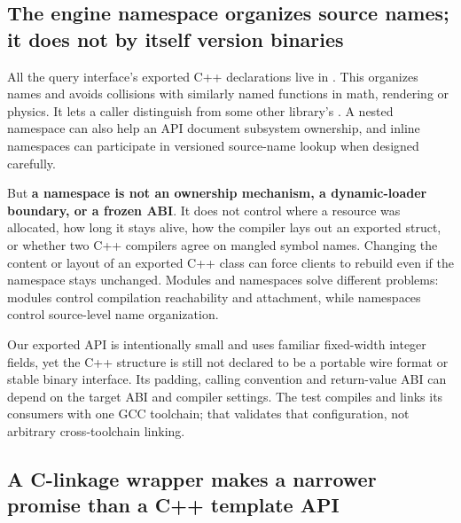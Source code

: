 \subsection{The engine namespace organizes source names; it does not by itself version binaries}\label{05-engine-i-ch006-the-engine-namespace-organizes-source-names-it-does-not-by-itself-version-binaries}

\hypertarget{05-engine-i-ch006-the-engine-namespace-organizes-source-names-it-does-not-by-itself-version-binaries}{}

All the query interface's exported C++ declarations live in . This organizes names and avoids collisions with similarly named functions in math, rendering or physics. It lets a caller distinguish  from some other library's . A nested namespace can also help an API document subsystem ownership, and inline namespaces can participate in versioned source-name lookup when designed carefully.

But \textbf{a namespace is not an ownership mechanism, a dynamic-loader boundary, or a frozen ABI}. It does not control where a resource was allocated, how long it stays alive, how the compiler lays out an exported struct, or whether two C++ compilers agree on mangled symbol names. Changing the content or layout of an exported C++ class can force clients to rebuild even if the namespace stays unchanged. Modules and namespaces solve different problems: modules control compilation reachability and attachment, while namespaces control source-level name organization.

Our exported API is intentionally small and uses familiar fixed-width integer fields, yet the C++  structure is still not declared to be a portable wire format or stable binary interface. Its padding, calling convention and return-value ABI can depend on the target ABI and compiler settings. The test compiles and links its consumers with one GCC toolchain; that validates that configuration, not arbitrary cross-toolchain linking.

\subsection{A C-linkage wrapper makes a narrower promise than a C++ template API}\label{05-engine-i-ch006-a-c-linkage-wrapper-makes-a-narrower-promise-than-a-c-template-api}

